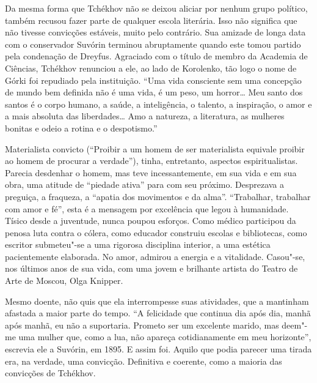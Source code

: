 Da mesma forma que Tchékhov não se deixou aliciar por nenhum grupo
político, também recusou fazer parte de qualquer escola literária.
Isso não significa que não tivesse convicções estáveis, muito pelo
contrário. Sua amizade de longa data com o conservador Suvórin terminou
abruptamente quando este tomou partido pela condenação de Dreyfus.
Agraciado com o título de membro da Academia de Ciências, Tchékhov
renunciou a ele, ao lado de Korolenko, tão logo o nome de Górki foi
repudiado pela instituição. ``Uma vida consciente sem uma concepção
de mundo bem definida não é uma vida, é um peso, um horror\ldots{}
Meu santo dos santos é o corpo humano, a saúde, a inteligência, o
talento, a inspiração, o amor e a mais absoluta das liberdades\ldots{}
Amo a natureza, a literatura, as mulheres bonitas e odeio a rotina e
o despotismo.''

Materialista convicto (``Proibir a um homem de ser materialista
equivale proibir ao homem de procurar a verdade''), tinha,
entretanto, aspectos espiritualistas. Parecia desdenhar o homem,
mas teve incessantemente, em sua vida e em sua obra, uma atitude
de ``piedade ativa'' para com seu próximo. Desprezava a preguiça,
a fraqueza, a ``apatia dos movimentos e da alma''. ``Trabalhar,
trabalhar com amor e fé'', esta é a mensagem por excelência que
legou à humanidade. Tísico desde a juventude, nunca poupou esforços.
Como médico participou da penosa luta contra o cólera, como educador
construiu escolas e bibliotecas, como escritor submeteu"-se a uma
rigorosa disciplina interior, a uma estética pacientemente elaborada.
No amor, admirou a energia e a vitalidade. Casou"-se, nos últimos
anos de sua vida, com uma jovem e brilhante artista do Teatro de
Arte de Moscou, Olga Knipper.

Mesmo doente, não quis que ela interrompesse suas atividades, que
a mantinham afastada a maior parte do tempo. ``A felicidade que
continua dia após dia, manhã após manhã, eu não a suportaria.
Prometo ser um excelente marido, mas deem"-me uma mulher que,
como a lua, não apareça cotidianamente em meu horizonte'',
escrevia ele a Suvórin, em 1895. E assim foi. Aquilo que podia
parecer uma tirada era, na verdade, uma convicção. Definitiva e
coerente, como a maioria das convicções de Tchékhov.

